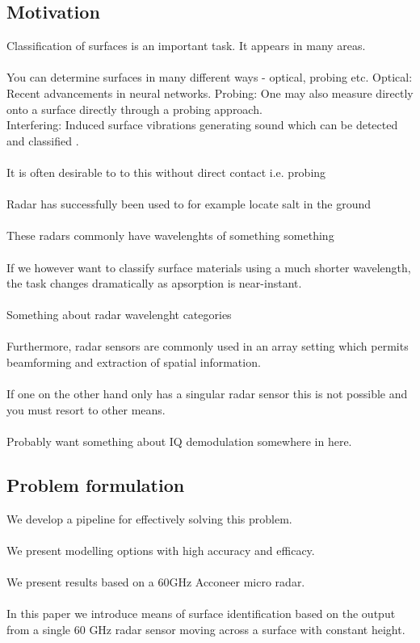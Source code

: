 \documentclass[a4paper, 12pt]{article}
\begin{document}
\subsection{Motivation}

Classification of surfaces is an important task. It appears in many areas.
\\ \\
You can determine surfaces in many different ways - optical, probing etc.
\noindent Optical: Recent advancements in neural networks. 
\noindent Probing: One may also measure directly onto a surface directly through a probing approach. \\
\noindent Interfering: Induced surface vibrations generating sound which can be detected and classified  \citep{strese_schuwerk_iepure_steinbach_2017}.
\\ \\
It is often desirable to to this without direct contact i.e. probing
\\ \\
Radar has successfully been used to for example locate salt in the ground
\\ \\
These radars commonly have wavelenghts of something something
\\ \\
If we however want to classify surface materials using a much shorter wavelength, the task changes dramatically as apsorption is near-instant. 
\\ \\
Something about radar wavelenght categories
\\ \\
Furthermore, radar sensors are commonly used in an array setting which permits beamforming and extraction of spatial information. 
\\ \\
If one on the other hand only has a singular radar sensor this is not possible and you must resort to other means.
\\ \\
Probably want something about IQ demodulation somewhere in here.

\subsection{Problem formulation}

We develop a pipeline for effectively solving this problem. 
\\ \\
We present modelling options with high accuracy and efficacy. 
\\ \\ 
We present results based on a 60GHz Acconeer micro radar. 
\\ \\
In this paper we introduce means of surface identification based on the output from a single 60 GHz radar sensor moving across a surface with constant height. 
\end{document}
